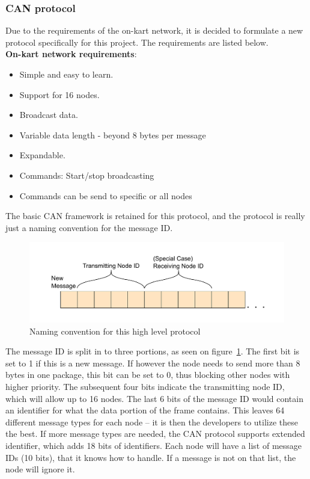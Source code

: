 
\subsubsection{CAN protocol}\label{sub:CAN_protocol}
Due to the requirements of the on-kart network, it is decided to formulate a new protocol specifically for this project. The requirements are listed below.\\
\textbf{On-kart network requirements}:
\begin{itemize}
	\item Simple and easy to learn.
	\item Support for 16 nodes.
	\item Broadcast data.
	\item Variable data length - beyond 8 bytes per message
	\item Expandable.
	\item Commands: Start/stop broadcasting 
	\item Commands can be send to specific or all nodes
\end{itemize}

The basic CAN framework is retained for this protocol, and the protocol is really just a naming convention for the message ID. 

\begin{figure}[h!]
	\centering
	\includegraphics[width = 0.9\linewidth]{graphics/CAN_protocol_general_pdf}
	\caption{Naming convention for this high level protocol}
	\label{fig:CAN_protocol_general_pdf}
\end{figure}

The message ID is split in to three portions, as seen on figure~\ref{fig:CAN_protocol_general_pdf}.
The first bit is set to 1 if this is a new message.
If however the node needs to send more than 8 bytes in one package, this bit can be set to 0, thus blocking other nodes with higher priority.
The subsequent four bits indicate the transmitting node ID, which will allow up to 16 nodes. 
The last 6 bits of the message ID would contain an identifier for what the data portion of the frame contains.
This leaves 64 different message types for each node -- it is then the developers to utilize these the best. 
If more message types are needed, the CAN protocol supports extended identifier, which adds 18 bits of identifiers.
Each node will have a list of message IDs (10 bits), that it knows how to handle.
If a message is not on that list, the node will ignore it.\\

